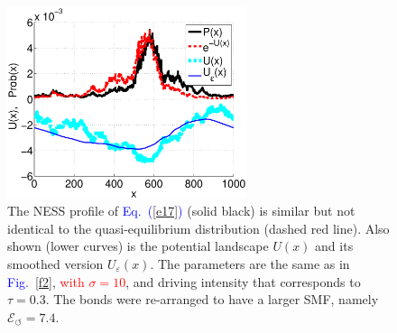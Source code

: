 \documentclass[aps,prl,floats,floatfix,twocolumn]{revtex4}
\newcommand{\Eq}[1]{\textcolor{blue}{Eq.\!\!~(\ref{#1})}}
\newcommand{\Fig}[1]{\textcolor{blue}{Fig.}\!\!~\ref{#1}}
\newcommand{\rmrk}[1]{\textcolor{red}{#1}}
\begin{document}
\begin{figure}
\includegraphics[width=7cm]{PvsV4}

\caption{
The NESS profile of \Eq{e17} (solid black) 
is similar but not identical to the quasi-equilibrium 
distribution (dashed red line). 
Also shown (lower curves) is the potential landscape $U(x)$ 
and its smoothed version $U_{\varepsilon}(x)$. 
The parameters are the same as in \Fig{f2}, 
\rmrk{with $\sigma=10$}, 
and driving intensity that corresponds to $\tau=0.3$.
The bonds were re-arranged to have a larger SMF,
namely $\mathcal{E}_{\circlearrowleft}=7.4$.}

\label{f3}
\end{figure}
\end{document}
